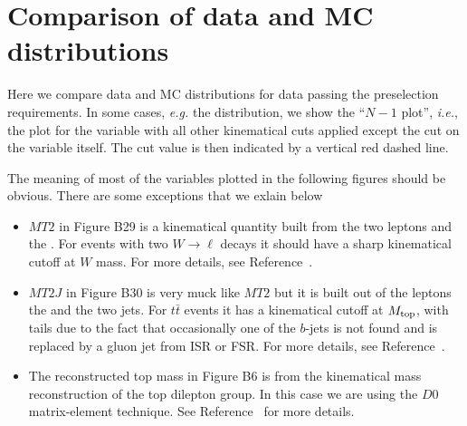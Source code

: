 \section{Comparison of data and MC distributions}
\label{sec:appendix}
Here we compare data and MC distributions for data passing the 
preselection requirements.  In some cases, {\em e.g.} the 
\met distribution, we show the ``$N-1$ plot'', {\em i.e.}, the 
plot for the variable with all other kinematical cuts
applied except the cut on the variable itself.  The
cut value is then indicated by a vertical red dashed line.

The meaning of most of the variables plotted in 
the following figures should be obvious.  There
are some exceptions that we exlain below

\begin{itemize}

\item $MT2$ in Figure B29 is a kinematical quantity 
built from the two leptons and the \met.  For events with
two $W \to \ell$ decays it should have a sharp kinematical cutoff
at $W$ mass.  For more details, see Reference~\cite{ref:MT2}.

\item $MT2J$ in Figure B30 is very muck like $MT2$ but it is built 
out of the leptons the \met and the two jets.  For $t\bar{t}$
events it has a kinematical cutoff at $M_{\rm top}$, with tails
due to the fact that occasionally one of the $b$-jets is not
found and is replaced by a gluon jet from ISR or FSR.
For more details, see Reference~\cite{ref:MT2J}.

\item The reconstructed top mass in Figure B6 is from the 
kinematical mass reconstruction of the top dilepton group.
In this case we are using the $D0$ matrix-element technique.
See Reference~\cite{ref:brown} for more details.

\end{itemize}


\clearpage

%
%



